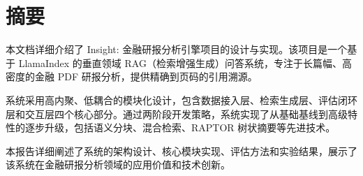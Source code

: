 \section{摘要}

本文档详细介绍了 Insight: 金融研报分析引擎项目的设计与实现。该项目是一个基于 LlamaIndex 的垂直领域 RAG（检索增强生成）问答系统，专注于长篇幅、高密度的金融 PDF 研报分析，提供精确到页码的引用溯源。

系统采用高内聚、低耦合的模块化设计，包含数据接入层、检索生成层、评估闭环层和交互层四个核心部分。通过两阶段开发策略，系统实现了从基础基线到高级特性的逐步升级，包括语义分块、混合检索、RAPTOR 树状摘要等先进技术。

本报告详细阐述了系统的架构设计、核心模块实现、评估方法和实验结果，展示了该系统在金融研报分析领域的应用价值和技术创新。
